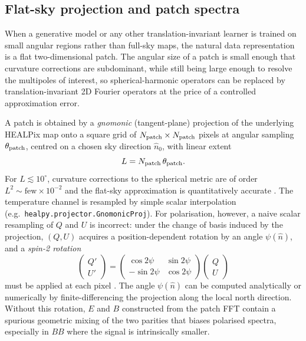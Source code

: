 \documentclass[11pt]{article}
\theoremstyle{definition}
\begin{document}
\subsection{Flat-sky projection and patch spectra}
\label{sec:flatsky}

When a generative model or any other translation-invariant learner is trained on small angular regions rather than full-sky maps, the natural data representation is a flat two-dimensional patch. The angular size of a patch is small enough that curvature corrections are subdominant, while still being large enough to resolve the multipoles of interest, so spherical-harmonic operators can be replaced by translation-invariant 2D Fourier operators at the price of a controlled approximation error.

A patch is obtained by a \emph{gnomonic} (tangent-plane) projection of the underlying HEALPix map onto a square grid of $N_{\rm patch}\times N_{\rm patch}$ pixels at angular sampling $\theta_{\rm patch}$, centred on a chosen sky direction $\hat n_0$, with linear extent
\begin{equation}
  L = N_{\rm patch}\,\theta_{\rm patch}.
\end{equation}
For $L\!\lesssim\!10^\circ$, curvature corrections to the spherical metric are of order $L^2\!\sim\!\mathrm{few}\times 10^{-2}$ and the flat-sky approximation is quantitatively accurate \cite{sullivan2024methods,seljak1997}. The temperature channel is resampled by simple scalar interpolation (e.g.~\texttt{healpy.projector.GnomonicProj}). For polarisation, however, a naive scalar resampling of \(Q\) and \(U\) is incorrect: under the change of basis induced by the projection, \((Q,U)\) acquires a position-dependent rotation by an angle \(\psi(\hat n)\), and a \emph{spin-2 rotation}
\begin{equation}
  \begin{pmatrix} Q' \\ U' \end{pmatrix}
  =
  \begin{pmatrix} \cos 2\psi & \sin 2\psi \\ -\sin 2\psi & \cos 2\psi \end{pmatrix}
  \begin{pmatrix} Q \\ U \end{pmatrix}
\end{equation}
must be applied at each pixel \cite{kamionkowski1997,seljak1997}. The angle \(\psi(\hat n)\) can be computed analytically or numerically by finite-differencing the projection along the local north direction. Without this rotation, $E$ and $B$ constructed from the patch FFT contain a spurious geometric mixing of the two parities that biases polarised spectra, especially in $BB$ where the signal is intrinsically smaller.
\end{document}
